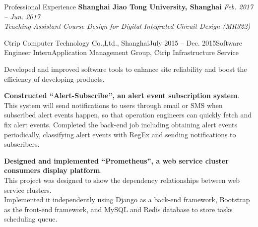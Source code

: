 \documentclass{resume_Stanford} %
\begin{document}
\begin{rSection}{Professional Experience}
\textbf{Shanghai Jiao Tong University, Shanghai} \hfill \emph{Feb. 2017 -- Jun. 2017}
\\\emph{Teaching Assistant} \hfill \emph {Course Design for Digital Integrated Circuit Design (MR322) }\\
\begin{rSubsection}{Ctrip Computer Technology Co.,Ltd., Shanghai}{July 2015 -- Dec. 2015}{Software Engineer Intern}{Application Management Group, Ctrip Infrastructure Service}
\item Developed and improved software tools to enhance site reliability and boost the efficiency of developing products.
\item \textbf{Constructed ``Alert-Subscribe'', an alert event subscription system}.  \\
This system will send notifications to users through email or SMS when subscribed alert events happen, so that operation engineers can quickly fetch and fix alert events. Completed the back-end job including obtaining alert events periodically, classifying alert events with RegEx and sending notifications to subscribers.
\item \textbf{Designed and implemented ``Prometheus'', a web service cluster consumers display platform}. \\
This project was designed to show the dependency relationships between web service clusters. \\
Implemented it independently using Django as a back-end framework, Bootstrap as the front-end framework, and MySQL and Redis database to store tasks scheduling queue.
\end{rSubsection}
\end{rSection}
\end{document}
